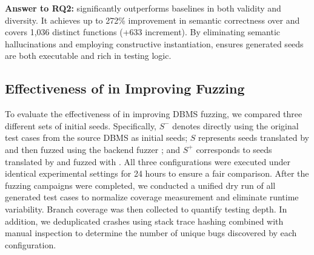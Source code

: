 \documentclass[sigconf,review,anonymous]{acmart}
\begin{document}
\begin{answerbox}
\textbf{Answer to RQ2:} \tool{} significantly outperforms baselines in both validity and diversity. It achieves up to 272\% improvement in semantic correctness over \sedar{} and covers 1,036 distinct functions (+633 increment). By eliminating semantic hallucinations and employing constructive instantiation, \tool{} ensures generated seeds are both executable and rich in testing logic.
\end{answerbox}

\subsection{Effectiveness of \tool{} in Improving Fuzzing}

To evaluate the effectiveness of \tool{} in improving DBMS fuzzing, we compared three different sets of initial seeds. Specifically, $S^-$ denotes directly using the original test cases from the source DBMS as initial seeds; $S$ represents seeds translated by \sedar{} and then fuzzed using the backend fuzzer \griffin{}; and $S^+$ corresponds to seeds translated by \tool{} and fuzzed with \griffin{}. All three configurations were executed under identical experimental settings for 24 hours to ensure a fair comparison.
After the fuzzing campaigns were completed, we conducted a unified dry run of all generated test cases to normalize coverage measurement and eliminate runtime variability. Branch coverage was then collected to quantify testing depth. In addition, we deduplicated crashes using stack trace hashing combined with manual inspection to determine the number of unique bugs discovered by each configuration.
\end{document}
